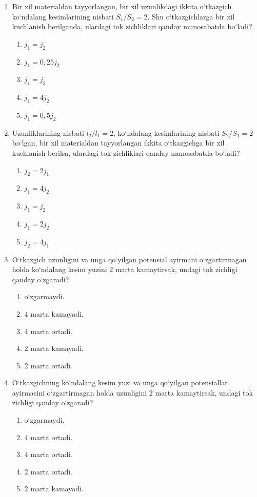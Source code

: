 \begin{enumerate}
\item Bir xil materialdan tayyorlangan, bir xil uzunlikdagi ikkita o‘tkazgich ko‘ndalang kesimlarining nisbati $S_1/S_2=2$. Shu o‘tkazgichlarga bir xil kuchlanish berilganda, ulardagi tok zichliklari qanday munosabatda bo‘ladi?
\begin{enumerate}[label=\Alph*)]
\item $j_1=j_2$
\item $j_1=0,25j_2$
\item $j_1=j_2$
\item $j_1=4j_2$
\item $j_1=0,5j_2$
\end{enumerate}

\item Uzunliklarining nisbati $l_2/l_1=2$, ko‘ndalang kesimlarining nisbati $S_2/S_1=2$ bo‘lgan, bir xil materialdan tayyorlangan ikkita o‘tkazgichga bir xil kuchlanish berilsa, ulardagi tok zichliklari qanday munosabatda bo‘ladi?
\begin{enumerate}[label=\Alph*)]
\item $j_2=2j_1$
\item $j_1=4j_2$
\item $j_1=j_2$
\item $j_1=2j_2$
\item $j_2=4j_1$
\end{enumerate}

\item O‘tkazgich uzunligini va unga qo‘yilgan potensial ayirmani o‘zgartirmagan holda ko‘ndalang kesim yuzini $2$ marta kamaytirsak, undagi tok zichligi qanday o‘zgaradi?
\begin{enumerate}[label=\Alph*)]
\item o‘zgarmaydi.
\item 4 marta kamayadi.
\item 4 marta ortadi.
\item 2 marta kamayadi.
\item 2 marta ortadi.
\end{enumerate}

\item O‘tkazgichning ko‘ndalang kesim yuzi va unga qo‘yilgan potensiallar ayirmasini o‘zgartirmagan holda uzunligini $2$ marta kamaytirsak, undagi tok zichligi qanday o‘zgaradi?
\begin{enumerate}[label=\Alph*)]
\item o‘zgarmaydi.
\item 4 marta ortadi.
\item 4 marta ortadi.
\item 2 marta ortadi.
\item 2 marta kamayadi.
\end{enumerate}


\end{enumerate}
